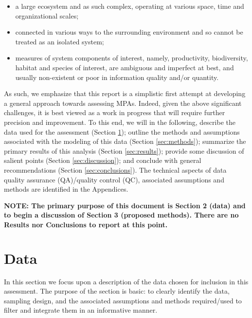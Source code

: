 \documentclass[letterpaper,portrait,11pt]{scrartcl}
\numberwithin{equation}{section}    %
\numberwithin{figure}{section}    %
\numberwithin{table}{section}       %
\begin{document}
\begin{itemize}
	\item a large ecosystem and as such complex, operating at various space, time and organizational scales;
	\item connected in various ways to the surrounding environment and so cannot be treated as an isolated system;
	\item measures of system components of interest, namely, productivity, biodiversity, habitat and species of interest, are ambiguous and imperfect at best, and usually non-existent or poor in information quality and/or quantity.
\end{itemize}


As such, we emphasize that this report is a simplistic first attempt at developing a general approach towards assessing MPAs. Indeed, given the above significant challenges, it is best viewed as a work in progress that will require further precision and improvement. To this end, we will in the following, describe the data used for the assessment (Section \ref{sec:data}); outline the methods and assumptions associated with the modeling of this data (Section \ref{sec:methods}); summarize the primary results of this analysis (Section \ref{sec:results}); provide some discussion of salient points (Section \ref{sec:discussion}); and conclude with general recommendations (Section \ref{sec:conclusions}). The technical aspects of data quality assurance (QA)/quality control (QC), associated assumptions and methods are identified in the Appendices. 

\medskip

\textbf{NOTE: The primary purpose of this document is Section 2 (data) and to begin a discussion of Section 3 (proposed methods). There are no Results nor Conclusions to report at this point. }


\afterpage{\clearpage}
\section{Data} 
\label{sec:data}

In this section we focus upon a description of the data chosen for inclusion in this assessment. The purpose of the section is basic: to clearly identify the data, sampling design, and the associated assumptions and methods required/used to filter and integrate them in an informative manner. 
\end{document}
